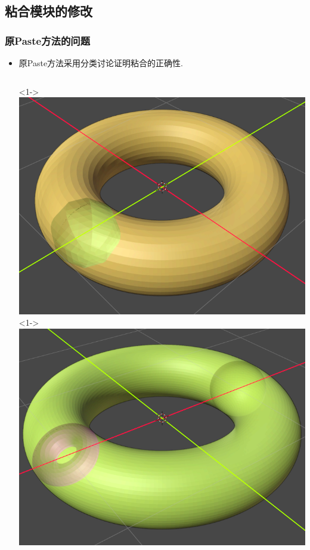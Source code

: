 \documentclass[UTF8]{ctexbeamer}	%
\theoremstyle{plain}
\theoremstyle{definition}
\theoremstyle{remark}
\numberwithin{equation}{section}
\begin{document}
\subsection{粘合模块的修改}
\begin{frame}
    \frametitle{原Paste方法的问题}
    \begin{itemize}
        \item 原Paste方法采用分类讨论证明粘合的正确性.
        \vspace{0.2in}
        \begin{columns}
       <1->
       \includegraphics[width = \textwidth]{fig/ys4.png}
       <1->
       \includegraphics[width = \textwidth]{fig/ys2.png}

\end{columns}
\end{itemize}
\end{frame}
\end{document}
